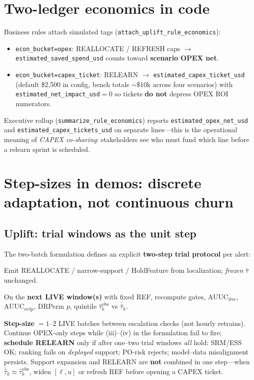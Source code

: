 \documentclass[11pt]{article}
\begin{document}
\section{Two-ledger economics in code}
Business rules attach simulated tags (\texttt{attach\_uplift\_rule\_economics}):
\begin{itemize}[nosep]
  \item \texttt{econ\_bucket=opex}: REALLOCATE / REFRESH caps $\rightarrow$ \texttt{estimated\_saved\_spend\_usd} counts toward \textbf{scenario OPEX net}.
  \item \texttt{econ\_bucket=capex\_ticket}: RELEARN $\rightarrow$ \texttt{estimated\_capex\_ticket\_usd} (default \$2{,}500 in config, bench totals $\sim\$10$k across four scenarios) with \texttt{estimated\_net\_impact\_usd}$=0$ so tickets \textbf{do not} depress OPEX ROI numerators.
\end{itemize}
Executive rollup (\texttt{summarize\_rule\_economics}) reports \texttt{estimated\_opex\_net\_usd} and \texttt{estimated\_capex\_tickets\_usd} on separate lines---this is the operational meaning of \emph{CAPEX co-sharing}: stakeholders see who must fund which line before a relearn sprint is scheduled.

\section{Step-sizes in demos: discrete adaptation, not continuous churn}

\subsection{Uplift: trial windows as the unit step}
The two-batch formulation defines an explicit \textbf{two-step trial protocol} per alert:
\begin{description}[style=nextline,font=\normalfont\bfseries]
  \item[Step A (apply).] Emit REALLOCATE / narrow-support / HoldFeature from localization; \emph{frozen} $\hat\tau$ unchanged.
  \item[Step B (re-monitor).] On the \textbf{next LIVE window(s)} with fixed REF, recompute gates, $\mathrm{AUUC}_{\mathrm{live}}$, $\mathrm{AUUC}_{\mathrm{ovlp}}$, DRPerm $p$, quintile $\widehat{\tau}^{\mathrm{obs}}_k$ vs $\bar{\hat\tau}_k$.
\end{description}
\textbf{Step-size} $=1$--$2$ LIVE batches between escalation checks (not hourly retrains).
Continue OPEX-only steps while (iii)--(iv) in the formulation fail to fire; \textbf{schedule RELEARN} only if after one--two trial windows \emph{all} hold: SRM/ESS OK; ranking fails on \emph{deployed} support; PO-risk rejects; model--data misalignment persists.
Support expansion and RELEARN are \textbf{not} combined in one step---when $\bar{\hat\tau}_k\approx\widehat{\tau}^{\mathrm{obs}}_k$, widen $[\ell,u]$ or refresh REF before opening a CAPEX ticket.
\end{document}
